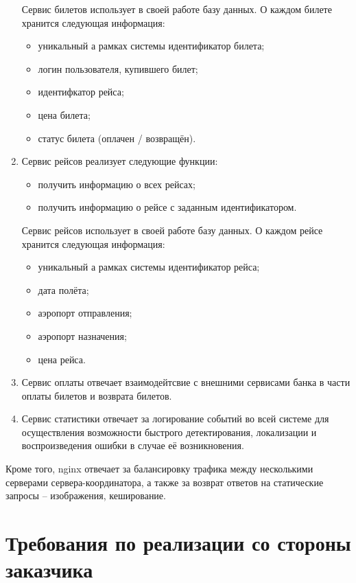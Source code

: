 \begin{enumerate}
     Сервис билетов использует в своей работе базу данных. О каждом билете хранится следующая информация:
    \begin{itemize}
        \item уникальный а рамках системы идентификатор билета;
        \item логин пользователя, купившего билет;
        \item идентифкатор рейса;
        \item цена билета;
        \item статус билета (оплачен / возвращён).
    \end{itemize}
    
    \item Сервис рейсов реализует следующие функции:
    \begin{itemize}
        \item получить информацию о всех рейсах; 
        \item получить информацию о рейсе с заданным идентификатором.
    \end{itemize}

    Сервис рейсов использует в своей работе базу данных. О каждом рейсе хранится следующая информация:
    \begin{itemize}
        \item уникальный а рамках системы идентификатор рейса;
        \item дата полёта;
        \item аэропорт отправления;
        \item аэропорт назначения;
        \item цена рейса.
    \end{itemize}

    \item Сервис оплаты отвечает взаимодейтсвие с внешними сервисами банка в части оплаты билетов и возврата билетов.
    
    \item Сервис статистики отвечает за логирование событий во всей системе для осуществления возможности быстрого детектирования, локализации и воспроизведения ошибки в случае её возникновения. 
\end{enumerate}

Кроме того, nginx отвечает за балансировку трафика между несколькими серверами сервера-координатора, а также за возврат ответов на статические запросы -- изображения, кеширование.

\section*{Требования по реализации со стороны заказчика}

